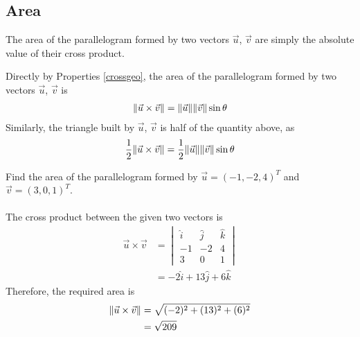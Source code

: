 \subsection{Area}
The area of the parallelogram formed by two vectors $\vec{u}$, $\vec{v}$ are simply the absolute value of their cross product.
\begin{center}
\end{center}
\begin{proper}
\label{parallelogram}
Directly by Properties \ref{crossgeo}, the area of the parallelogram formed by two vectors $\vec{u}$, $\vec{v}$ is
\begin{align*}
\norm{\vec{u} \times \vec{v}} = \norm{\vec{u}}\norm{\vec{v}}\sin\theta
\end{align*}
Similarly, the triangle built by $\vec{u}$, $\vec{v}$ is half of the quantity above, as
\begin{align*}
\frac{1}{2}\norm{\vec{u} \times \vec{v}} = \frac{1}{2}\norm{\vec{u}}\norm{\vec{v}}\sin\theta   
\end{align*}
\end{proper}

\begin{exmp}
Find the area of the parallelogram formed by $\vec{u} = (-1, -2, 4)^T$ and $\vec{v} = (3, 0, 1)^T$.\\
\\
The cross product between the given two vectors is
\begin{align*}
\vec{u} \times \vec{v} &=
\begin{vmatrix}
\hat{i} & \hat{j} & \hat{k} \\
-1 & -2 & 4 \\
3 & 0 & 1
\end{vmatrix} \\
&= -2\hat{i} + 13\hat{j} + 6\hat{k}
\end{align*}
Therefore, the required area is
\begin{align*}
\norm{\vec{u} \times \vec{v}} &= \sqrt{(-2)^2 + (13)^2 + (6)^2} \\
&= \sqrt{209}
\end{align*}
\end{exmp}


